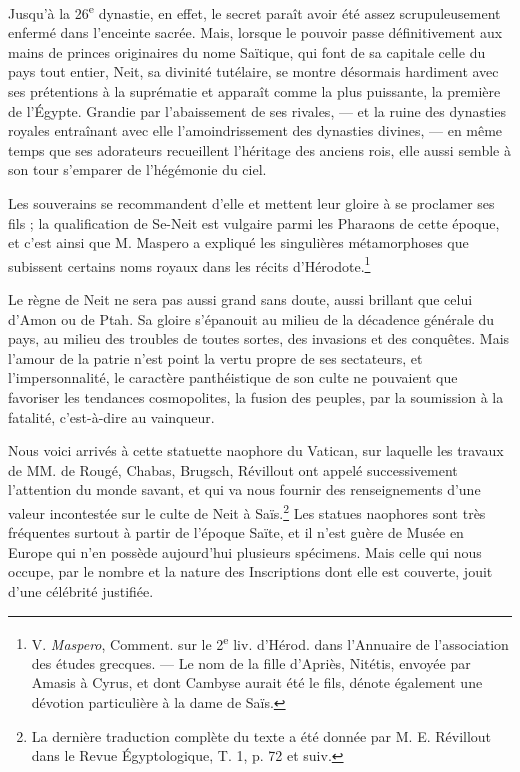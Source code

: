 \documentclass[a4paper, 11pt, oneside]{article}
\begin{document}
Jusqu'à la 26\textsuperscript{e} dynastie, en effet, le secret paraît avoir été assez scrupuleusement enfermé dans l'enceinte sacrée. Mais, lorsque le pouvoir passe définitivement aux mains de princes originaires du nome Saïtique, qui font de sa capitale celle du pays tout entier, Neit, sa divinité tutélaire, se montre désormais hardiment avec ses prétentions à la suprématie et apparaît comme la plus puissante, la première de l'Égypte. Grandie par l'abaissement de ses rivales, --- et la ruine des dynasties royales entraînant avec elle l'amoindrissement des dynasties divines, --- en même temps que ses adorateurs recueillent l'héritage des anciens rois, elle aussi semble à son tour s'emparer de l'hégémonie du ciel.

Les souverains se recommandent d'elle et mettent leur gloire à se proclamer ses fils ; la qualification de Se-Neit est vulgaire parmi les Pharaons de cette époque, et c'est ainsi que M. Maspero a expliqué les singulières métamorphoses que subissent certains noms royaux dans les récits d'Hérodote.\footnote{V. \emph{Maspero}, Comment. sur le 2\textsuperscript{e} liv. d'Hérod. dans l'Annuaire de l'association des études grecques. --- Le nom de la fille d'Apriès, Nitétis, envoyée par Amasis à Cyrus, et dont Cambyse aurait été le fils, dénote également une dévotion particulière à la dame de Saïs.}

Le règne de Neit ne sera pas aussi grand sans doute, aussi brillant que celui d'Amon ou de Ptah. Sa gloire s'épanouit au milieu de la décadence générale du pays, au milieu des troubles de toutes sortes, des invasions et des conquêtes. Mais l'amour de la patrie n'est point la vertu propre de ses sectateurs, et l'impersonnalité, le caractère panthéistique de son culte ne pouvaient que favoriser les tendances cosmopolites, la fusion des peuples, par la soumission à la fatalité, c'est-à-dire au vainqueur.

Nous voici arrivés à cette statuette naophore du Vatican, sur laquelle les travaux de MM. de Rougé, Chabas, Brugsch, Révillout ont appelé successivement l'attention du monde savant, et qui va nous fournir des renseignements d'une valeur incontestée sur le culte de Neit à Saïs.\footnote{La dernière traduction complète du texte a été donnée par M. E. Révillout dans le Revue Égyptologique, T. 1, p. 72 et suiv.} Les statues naophores sont très fréquentes surtout à partir de l'époque Saïte, et il n'est guère de Musée en Europe qui n'en possède aujourd'hui plusieurs spécimens. Mais celle qui nous occupe, par le nombre et la nature des Inscriptions dont elle est couverte, jouit d'une célébrité justifiée.
\end{document}
